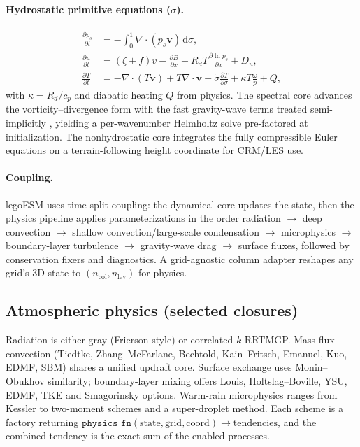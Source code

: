 \documentclass[11pt]{article}
\newcommand{\dd}{\mathrm{d}}
\newcommand{\pp}{\partial}
\newcommand{\Rd}{R_d}
\newcommand{\vect}[1]{\bm{#1}}
\newcommand{\divg}{\nabla\!\cdot\!}
\begin{document}
\paragraph{Hydrostatic primitive equations ($\sigma$).}
\begin{align}
\frac{\pp p_s}{\pp t}&=-\!\int_0^1\!\divg(p_s\vect{v})\,\dd\sigma,\\
\frac{\pp u}{\pp t}&=(\zeta+f)v-\frac{\pp B}{\pp x}-\Rd T\frac{\pp\ln p_s}{\pp x}+D_u,\\
\frac{\pp T}{\pp t}&=-\divg(T\vect{v})+T\divg\vect{v}-\dot\sigma\frac{\pp T}{\pp\sigma}
+\kappa T\frac{\omega}{p}+Q,
\end{align}
with $\kappa=\Rd/c_p$ and diabatic heating $Q$ from physics. The spectral core advances the
vorticity--divergence form with the fast gravity-wave terms treated semi-implicitly
\cite{HoskinsSimmons1975}, yielding a per-wavenumber Helmholtz solve pre-factored at
initialization. The nonhydrostatic core integrates the fully compressible Euler equations on a
terrain-following height coordinate for CRM/LES use.

\paragraph{Coupling.} legoESM uses time-split coupling: the dynamical core updates the state,
then the physics pipeline applies parameterizations in the order radiation $\rightarrow$ deep
convection $\rightarrow$ shallow convection/large-scale condensation $\rightarrow$ microphysics
$\rightarrow$ boundary-layer turbulence $\rightarrow$ gravity-wave drag $\rightarrow$ surface
fluxes, followed by conservation fixers and diagnostics. A grid-agnostic column adapter reshapes
any grid's 3D state to $(n_\mathrm{col},n_\mathrm{lev})$ for physics.

\subsection{Atmospheric physics (selected closures)}
Radiation is either gray (Frierson-style\cite{Frierson2006}) or correlated-$k$
RRTMGP\cite{Pincus2019}. Mass-flux convection (Tiedtke\cite{Tiedtke1989},
Zhang--McFarlane\cite{ZhangMcFarlane1995}, Bechtold, Kain--Fritsch, Emanuel, Kuo, EDMF, SBM)
shares a unified updraft core. Surface exchange uses Monin--Obukhov similarity; boundary-layer
mixing offers Louis, Holtslag--Boville, YSU, EDMF, TKE and Smagorinsky\cite{Smagorinsky1963}
options. Warm-rain microphysics ranges from Kessler to two-moment schemes and a super-droplet
method\cite{Shima2009}. Each scheme is a factory returning
$\texttt{physics\_fn}(\text{state},\text{grid},\text{coord})\!\to\!\text{tendencies}$, and the
combined tendency is the exact sum of the enabled processes.
\end{document}
